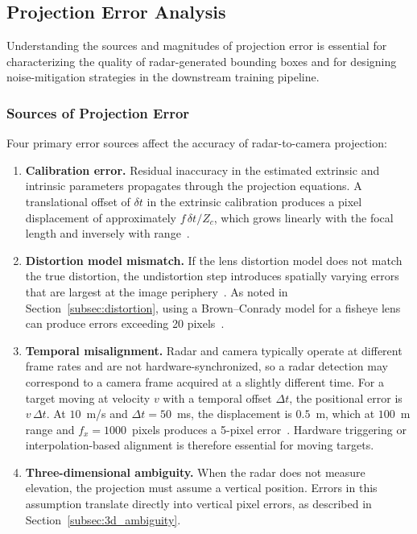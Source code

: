 \subsection{Projection Error Analysis}\label{subsec:projection_error}

Understanding the sources and magnitudes of projection error is essential for characterizing the quality of radar-generated bounding boxes and for designing noise-mitigation strategies in the downstream training pipeline.

\subsubsection{Sources of Projection Error}

Four primary error sources affect the accuracy of radar-to-camera projection:

\begin{enumerate}[label=(\roman*)]
  \item \textbf{Calibration error.} Residual inaccuracy in the estimated extrinsic and intrinsic parameters propagates through the projection equations. A translational offset of $\delta t$ in the extrinsic calibration produces a pixel displacement of approximately $f\,\delta t / Z_c$, which grows linearly with the focal length and inversely with range~\cite{zhang2000flexible}.

  \item \textbf{Distortion model mismatch.} If the lens distortion model does not match the true distortion, the undistortion step introduces spatially varying errors that are largest at the image periphery~\cite{kannala2006generic}. As noted in Section~\ref{subsec:distortion}, using a Brown--Conrady model for a fisheye lens can produce errors exceeding 20 pixels~\cite{xu2024maritime}.

  \item \textbf{Temporal misalignment.} Radar and camera typically operate at different frame rates and are not hardware-synchronized, so a radar detection may correspond to a camera frame acquired at a slightly different time. For a target moving at velocity $v$ with a temporal offset $\Delta t$, the positional error is $v\,\Delta t$. At $10$~m/s and $\Delta t = 50$~ms, the displacement is $0.5$~m, which at $100$~m range and $f_x = 1000$~pixels produces a 5-pixel error~\cite{Nabati2021CenterFusion}. Hardware triggering or interpolation-based alignment is therefore essential for moving targets.

  \item \textbf{Three-dimensional ambiguity.} When the radar does not measure elevation, the projection must assume a vertical position. Errors in this assumption translate directly into vertical pixel errors, as described in Section~\ref{subsec:3d_ambiguity}.
\end{enumerate}

